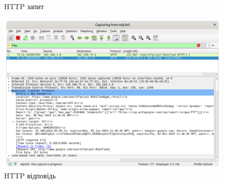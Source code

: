 \documentclass{article}
\begin{document}
\begin{normalsize}
\begin{figure}[H]
	\caption{HTTP запит}
\end{figure}
\begin{figure}[H]
	\centering
	\includegraphics[width=\textwidth]{34}
	\caption{HTTP відповідь}
\end{figure}


\end{normalsize}
\end{document}
